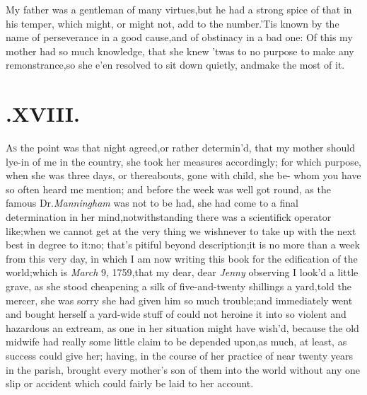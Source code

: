 \documentclass{article}
\begin{document}
My father was a gentleman of many virtues,\tsk  but he had a
strong spice of that in his temper, which might, or might not, add
to the number.\tsk  ’Tis known by the name of perseverance
in a good cause,\tsk  and of obstinacy in a bad one: Of this my
mother had so much know\-ledge, that she knew ’twas to no
purpose to make any remonstrance,\tsk  so she e’en resolved
to sit down quietly, and\break make the most of it.

\section{.\enspace XVIII.}

\lettrine{A}{s} the point was that night agreed,\break or rather
determin’d, that my mo\-ther should lye-in of me in the country, she
took her measures accordingly; for which purpose, when she was
three days, or thereabouts, gone with child, she be-
whom you have so often heard me mention; and
before the week was well got round, as the famous Dr.\thinspace \textit{Manningham} was not to be had, she had come to a final
determination in her mind,\tsh  notwith\-standing there was a scientifick \hbox{operator} 
like;\tsh  when we cannot get at the very thing we
wish\tsh  never to take up with the next best in degree to
it:\tsk  no; that’s pitiful beyond description;\tsk  it is
no more than a week from this very day, in which I am now writing
this book for the edification of the world;\tsk  which is
\textit{March} 9, 1759,\tsh  that my dear, dear \textit{Jenny}
observing I look’d a little grave, as she stood cheapening a silk
of five-and-twenty shillings a yard,\tsk  told the mercer, she was sorry she had given him so
much trouble;\tsk  and immediately went and bought herself a
yard-wide stuff of 
could not heroine it into so violent and hazardous an
extream, as one in her situation might have wish’d, because the
old midwife had really some little claim to be depended upon,\tsk  as
much, at least, as success could give her; having, in the course of
her practice of near twenty years in the parish, brought every
mother’s son of them into the world without any one slip or
accident which could fairly be laid to her account.
\end{document}
